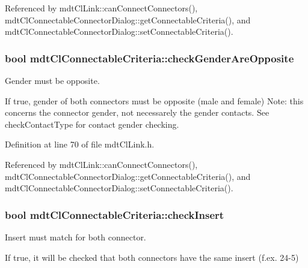 Referenced by mdt\-Cl\-Link\-::can\-Connect\-Connectors(), mdt\-Cl\-Connectable\-Connector\-Dialog\-::get\-Connectable\-Criteria(), and mdt\-Cl\-Connectable\-Connector\-Dialog\-::set\-Connectable\-Criteria().

\hypertarget{structmdt_cl_connectable_criteria_a540f153bd5b6c9d05ab9587438365c8d}{
\subsubsection[{check\-Gender\-Are\-Opposite}]{\setlength{\rightskip}{0pt plus 5cm}bool mdt\-Cl\-Connectable\-Criteria\-::check\-Gender\-Are\-Opposite}}\label{structmdt_cl_connectable_criteria_a540f153bd5b6c9d05ab9587438365c8d}


Gender must be opposite. 

If true, gender of both connectors must be opposite (male and female) Note\-: this concerns the connector gender, not necessarely the gender contacts. See check\-Contact\-Type for contact gender checking. 

Definition at line 70 of file mdt\-Cl\-Link.\-h.



Referenced by mdt\-Cl\-Link\-::can\-Connect\-Connectors(), mdt\-Cl\-Connectable\-Connector\-Dialog\-::get\-Connectable\-Criteria(), and mdt\-Cl\-Connectable\-Connector\-Dialog\-::set\-Connectable\-Criteria().

\hypertarget{structmdt_cl_connectable_criteria_a563935ae7679899d23ba67e0f49c0f5e}{
\subsubsection[{check\-Insert}]{\setlength{\rightskip}{0pt plus 5cm}bool mdt\-Cl\-Connectable\-Criteria\-::check\-Insert}}\label{structmdt_cl_connectable_criteria_a563935ae7679899d23ba67e0f49c0f5e}


Insert must match for both connector. 

If true, it will be checked that both connectors have the same insert (f.\-ex. 24-\/5) 

